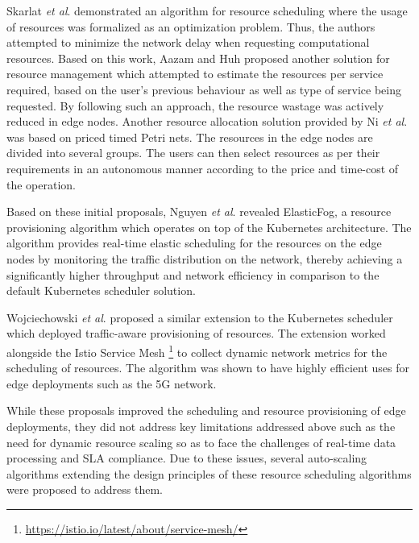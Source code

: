 Skarlat \textit{et al}. \cite{skarlat2016resource} demonstrated an algorithm for resource scheduling where the usage of resources was formalized as an optimization problem. Thus, the authors attempted to minimize the network delay when requesting computational resources. Based on this work, Aazam and Huh \cite{aazam2015dynamic} proposed another solution for resource management which attempted to estimate the resources per service required, based on the user's previous behaviour as well as type of service being requested. By following such an approach, the resource wastage was actively reduced in edge nodes. Another resource allocation solution provided by Ni \textit{et al}. \cite{ni2017resource} was based on priced timed Petri nets. The resources in the edge nodes are divided into several groups. The users can then select resources as per their requirements in an autonomous manner according to the price and time-cost of the operation.\par

Based on these initial proposals, Nguyen \textit{et al}. \cite{nguyen2020elasticfog} revealed ElasticFog, a resource provisioning algorithm which operates on top of the Kubernetes architecture. The algorithm provides real-time elastic scheduling for the resources on the edge nodes by monitoring the traffic distribution on the network, thereby achieving a significantly higher throughput and network efficiency in comparison to the default Kubernetes scheduler solution.\par

Wojciechowski \textit{et al}. \cite{wojciechowski2021netmarks} proposed a similar extension to the Kubernetes scheduler which deployed traffic-aware provisioning of resources. The extension worked alongside the Istio Service Mesh \footnote{\url{https://istio.io/latest/about/service-mesh/}} to collect dynamic network metrics for the scheduling of resources. The algorithm was shown to have highly efficient uses for edge deployments such as the 5G network.\par

While these proposals improved the scheduling and resource provisioning of edge deployments, they did not address key limitations addressed above such as the need for dynamic resource scaling so as to face the challenges of real-time data processing and SLA compliance. Due to these issues, several auto-scaling algorithms extending the design principles of these resource scheduling algorithms were proposed to address them.

